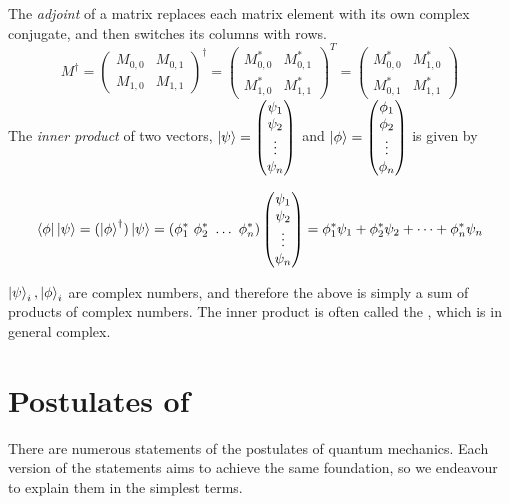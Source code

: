 \begin{itemize}
The \textit{adjoint} of a matrix replaces each matrix element with its own complex conjugate, and then switches its columns with rows.
    \begin{equation}
    M^{\dag} = \begin{pmatrix}
    M_{0,0} & M_{0,1} \\ M_{1,0} & M_{1,1} \end{pmatrix}  ^{\dag} = 
    \begin{pmatrix}
    M_{0,0}^* & M_{0,1}^* \\ M_{1,0}^* & M_{1,1}^* \end{pmatrix} ^T = 
    \begin{pmatrix}
    M_{0,0}^* & M_{1,0}^* \\ M_{0,1}^* & M_{1,1}^* \end{pmatrix}
    \end{equation}
The \textit{inner product} of two vectors, $\ket{\psi} = \left(\begin{matrix}\psi_1 \\ \psi_2 \\ \vdots \\ \psi_n\end{matrix}\right)$ and $\ket{\phi}= \left(\begin{matrix}\phi_1 \\ \phi_2 \\ \vdots \\ \phi_n \end{matrix}\right)$ is given by 

    \begin{equation}
    \bra{\phi} \ket{\psi} = (\ket{\phi}^{\dag})\ket{\psi}
    = (\phi_1^* \ \phi_2^* \ \hdots \ \phi_n^*) \left(\begin{matrix}\psi_1 \\ \psi_2 \\ \vdots \\ \psi_n\end{matrix}\right)
    = \phi_1^* \psi_1 + \phi_2^* \psi_2 + \dots + \phi_n^* \psi_n
    \end{equation}

$\ket{\psi}_i, \ket{\phi}_i$ are complex numbers, and therefore the above is simply a sum of products of complex numbers. 
The inner product is often called the , which is in general complex.

\end{itemize}


\section{Postulates of }\label{sec:postulates}

There are numerous statements of the postulates of quantum mechanics. 
Each version of the statements aims to achieve the same foundation, so we endeavour to explain them in the simplest terms. 

